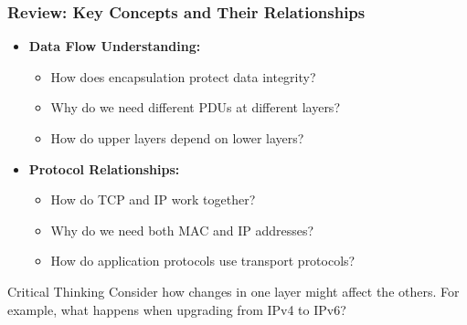 \documentclass{beamer}
\begin{document}
\begin{frame}
    \frametitle{Review: Key Concepts and Their Relationships}
    
    \begin{itemize}
        \item \textbf{Data Flow Understanding:}
        \begin{itemize}
            \item How does encapsulation protect data integrity?
            \item Why do we need different PDUs at different layers?
            \item How do upper layers depend on lower layers?
        \end{itemize}
        
        \item \textbf{Protocol Relationships:}
        \begin{itemize}
            \item How do TCP and IP work together?
            \item Why do we need both MAC and IP addresses?
            \item How do application protocols use transport protocols?
        \end{itemize}
    \end{itemize}
    
    \begin{alertblock}{Critical Thinking}
        Consider how changes in one layer might affect the others. For example, what happens when upgrading from IPv4 to IPv6?
    \end{alertblock}
\end{frame}
\end{document}
